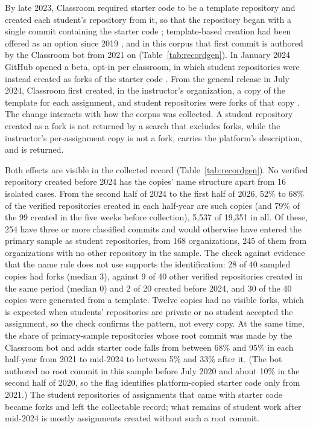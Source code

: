 \documentclass[acmsmall,screen,review,anonymous]{acmart}
\begin{document}
By late 2023, Classroom required starter code to be a template repository and created each student's repository from it, so that the repository began with a single commit containing the starter code \citep{github2023classroomchanges}; template-based creation had been offered as an option since 2019 \citep{github2019classroomboost}, and in this corpus that first commit is authored by the Classroom bot from 2021 on (Table~\ref{tab:recordgen}). In January 2024 GitHub opened a beta, opt-in per classroom, in which student repositories were instead created as forks of the starter code \citep{github2023classroomchanges, github2024forksbeta}. From the general release in July 2024, Classroom first created, in the instructor's organization, a copy of the template for each assignment, and student repositories were forks of that copy \citep{github2024forksga, githubdocs2026template}. The change interacts with how the corpus was collected. A student repository created as a fork is not returned by a search that excludes forks, while the instructor's per-assignment copy is not a fork, carries the platform's description, and is returned.

Both effects are visible in the collected record (Table~\ref{tab:recordgen}). No verified repository created before 2024 has the copies' name structure apart from 16 isolated cases. From the second half of 2024 to the first half of 2026, 52\% to 68\% of the verified repositories created in each half-year are such copies (and 79\% of the 99 created in the five weeks before collection), 5,537 of 19,351 in all. Of these, 254 have three or more classified commits and would otherwise have entered the primary sample as student repositories, from 168 organizations, 245 of them from organizations with no other repository in the sample. The check against evidence that the name rule does not use supports the identification: 28 of 40 sampled copies had forks (median 3), against 9 of 40 other verified repositories created in the same period (median 0) and 2 of 20 created before 2024, and 30 of the 40 copies were generated from a template. Twelve copies had no visible forks, which is expected when students' repositories are private or no student accepted the assignment, so the check confirms the pattern, not every copy. At the same time, the share of primary-sample repositories whose root commit was made by the Classroom bot and adds starter code falls from between 68\% and 95\% in each half-year from 2021 to mid-2024 to between 5\% and 33\% after it. (The bot authored no root commit in this sample before July 2020 and about 10\% in the second half of 2020, so the flag identifies platform-copied starter code only from 2021.) The student repositories of assignments that came with starter code became forks and left the collectable record; what remains of student work after mid-2024 is mostly assignments created without such a root commit.
\end{document}
